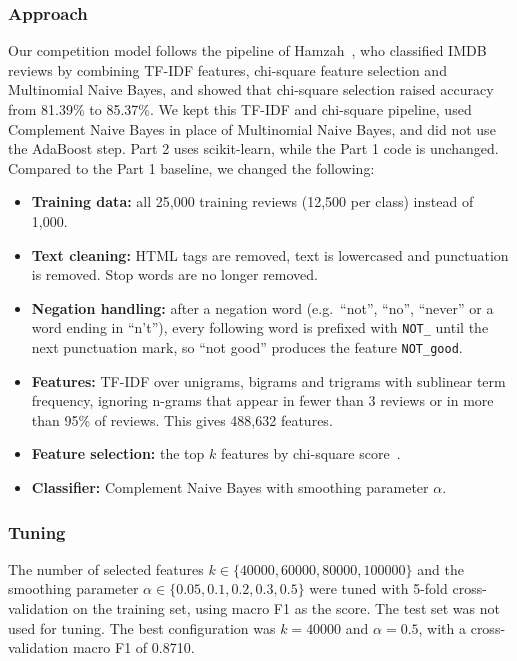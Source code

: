 \documentclass[sigconf]{acmart}
\begin{document}
\subsubsection{Approach}
Our competition model follows the pipeline of Hamzah~\cite{hamzah2021}, who classified IMDB reviews by combining TF-IDF features, chi-square feature selection and Multinomial Naive Bayes, and showed that chi-square selection raised accuracy from 81.39\% to 85.37\%. We kept this TF-IDF and chi-square pipeline, used Complement Naive Bayes in place of Multinomial Naive Bayes, and did not use the AdaBoost step. Part 2 uses scikit-learn, while the Part 1 code is unchanged. Compared to the Part 1 baseline, we changed the following:
\begin{itemize}
    \item \textbf{Training data:} all 25,000 training reviews (12,500 per class) instead of 1,000.
    \item \textbf{Text cleaning:} HTML tags are removed, text is lowercased and punctuation is removed. Stop words are no longer removed.
    \item \textbf{Negation handling:} after a negation word (e.g.\ ``not'', ``no'', ``never'' or a word ending in ``n't''), every following word is prefixed with \texttt{NOT\_} until the next punctuation mark, so ``not good'' produces the feature \texttt{NOT\_good}.
    \item \textbf{Features:} TF-IDF over unigrams, bigrams and trigrams with sublinear term frequency, ignoring n-grams that appear in fewer than 3 reviews or in more than 95\% of reviews. This gives 488,632 features.
    \item \textbf{Feature selection:} the top $k$ features by chi-square score~\cite{hamzah2021}.
    \item \textbf{Classifier:} Complement Naive Bayes with smoothing parameter $\alpha$.
\end{itemize}

\subsubsection{Tuning}
The number of selected features $k \in \{40000, 60000, 80000, 100000\}$ and the smoothing parameter $\alpha \in \{0.05, 0.1, 0.2, 0.3, 0.5\}$ were tuned with 5-fold cross-validation on the training set, using macro F1 as the score. The test set was not used for tuning. The best configuration was $k = 40000$ and $\alpha = 0.5$, with a cross-validation macro F1 of 0.8710.
\end{document}
